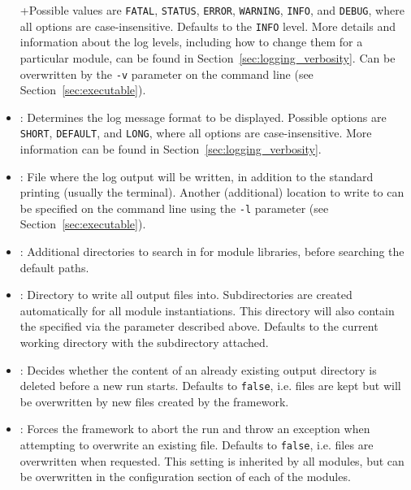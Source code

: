 \begin{itemize}
+Possible values are \texttt{FATAL}, \texttt{STATUS}, \texttt{ERROR}, \texttt{WARNING}, \texttt{INFO}, and \texttt{DEBUG}, where all options are case-insensitive.
Defaults to the \texttt{INFO} level.
More details and information about the log levels, including how to change them for a particular module, can be found in Section~\ref{sec:logging_verbosity}.
Can be overwritten by the \texttt{-v} parameter on the command line (see Section~\ref{sec:executable}).
\item {}: Determines the log message format to be displayed.
Possible options are \texttt{SHORT}, \texttt{DEFAULT}, and \texttt{LONG}, where all options are case-insensitive.
More information can be found in Section~\ref{sec:logging_verbosity}.
\item {}: File where the log output will be written, in addition to the standard printing (usually the terminal).
Another (additional) location to write to can be specified on the command line using the \texttt{-l} parameter (see Section~\ref{sec:executable}).
\item {}: Additional directories to search in for module libraries, before searching the default paths.
\item {}: Directory to write all output files into.
Subdirectories are created automatically for all module instantiations.
This directory will also contain the  specified via the parameter described above.
Defaults to the current working directory with the subdirectory  attached.
\item {}: Decides whether the content of an already existing output directory is deleted before a new run starts. Defaults to \texttt{false}, i.e. files are kept but will be overwritten by new files created by the framework.
\item {}: Forces the framework to abort the run and throw an exception when attempting to overwrite an existing file. Defaults to \texttt{false}, i.e. files are overwritten when requested. This setting is inherited by all modules, but can be overwritten in the configuration section of each of the modules.
\end{itemize}

